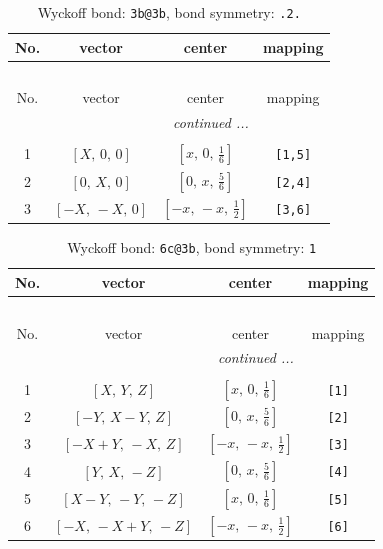 \documentclass[fleqn,8pt]{jsarticle}
\begin{document}
\renewcommand{\arraystretch}{1.2}
\begin{longtable}{cccc}
\caption{Wyckoff bond: {\tt 3b@3b}, bond symmetry: {\tt .2.}}
 \\
 \hline \hline
No. & vector & center & mapping \\ \hline \endfirsthead

\multicolumn{3}{l}{\tablename\ \thetable{}} \\
 \hline \hline
No. & vector & center & mapping \\ \hline \endhead

 \hline \hline
\multicolumn{3}{r}{\footnotesize\it continued ...} \\ \endfoot

 \hline \hline
\multicolumn{3}{r}{} \\ \endlastfoot

1 & $\left[ X,\, 0,\, 0 \right]$ & $\left[ x,\, 0,\, \frac{1}{6} \right]$ & {\tt [1,5]} \\ \hline
2 & $\left[ 0,\, X,\, 0 \right]$ & $\left[ 0,\, x,\, \frac{5}{6} \right]$ & {\tt [2,4]} \\ \hline
3 & $\left[ - X,\, - X,\, 0 \right]$ & $\left[ - x,\, - x,\, \frac{1}{2} \right]$ & {\tt [3,6]} \\
\end{longtable}
\renewcommand{\arraystretch}{1.2}
\begin{longtable}{cccc}
\caption{Wyckoff bond: {\tt 6c@3b}, bond symmetry: {\tt 1}}
 \\
 \hline \hline
No. & vector & center & mapping \\ \hline \endfirsthead

\multicolumn{3}{l}{\tablename\ \thetable{}} \\
 \hline \hline
No. & vector & center & mapping \\ \hline \endhead

 \hline \hline
\multicolumn{3}{r}{\footnotesize\it continued ...} \\ \endfoot

 \hline \hline
\multicolumn{3}{r}{} \\ \endlastfoot

1 & $\left[ X,\, Y,\, Z \right]$ & $\left[ x,\, 0,\, \frac{1}{6} \right]$ & {\tt [1]} \\ \hline
2 & $\left[ - Y,\, X - Y,\, Z \right]$ & $\left[ 0,\, x,\, \frac{5}{6} \right]$ & {\tt [2]} \\ \hline
3 & $\left[ - X + Y,\, - X,\, Z \right]$ & $\left[ - x,\, - x,\, \frac{1}{2} \right]$ & {\tt [3]} \\ \hline
4 & $\left[ Y,\, X,\, - Z \right]$ & $\left[ 0,\, x,\, \frac{5}{6} \right]$ & {\tt [4]} \\ \hline
5 & $\left[ X - Y,\, - Y,\, - Z \right]$ & $\left[ x,\, 0,\, \frac{1}{6} \right]$ & {\tt [5]} \\ \hline
6 & $\left[ - X,\, - X + Y,\, - Z \right]$ & $\left[ - x,\, - x,\, \frac{1}{2} \right]$ & {\tt [6]} \\
\end{longtable}
\end{document}
